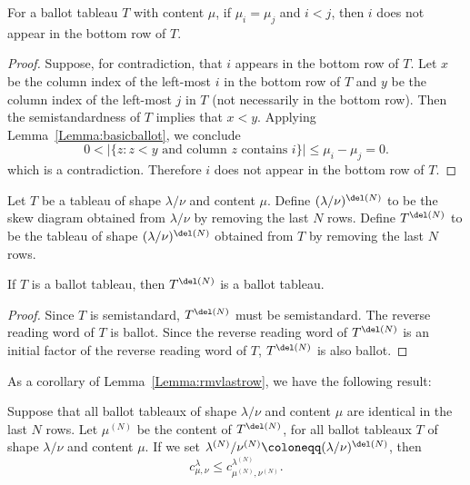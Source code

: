 \begin{lemma}\label{Lemma:rowofT}
For a ballot tableau $T$ with content $\mu$, if $\mu_i= \mu_j$ and $i<j$, then $i$ does not appear in the bottom row of $T$.
\end{lemma}
\begin{proof}
Suppose, for contradiction, that $i$ appears in the bottom row of $T$. Let $x$ be the column index of the left-most $i$ in the bottom row of $T$ and $y$ be the column index of the left-most $j$ in $T$ (not necessarily in the bottom row). Then the semistandardness of $T$ implies that $x<y$. Applying Lemma~\ref{Lemma:basicballot}, we conclude
\[ 
0 < |\{ z : z < y\text{ and column $z$ contains $i$} \}| \leq \mu_i-\mu_j = 0.
\]
which is a contradiction. Therefore $i$ does not appear in the bottom row of $T$.
\end{proof}

\begin{defi} \label{def:skewbottomrowremoval} Let $T$ be a tableau of shape $\lambda / \nu$ and content $\mu$. Define $(\lambda/\nu)^{\del(N)}$ to be the skew diagram obtained from $\lambda/\nu$ by removing the last $N$ rows. Define $T^{\del (N)}$ to be the tableau of shape $(\lambda/\nu)^{\del (N)}$ obtained from $T$ by removing the last $N$ rows. 
\end{defi} 
\begin{lemma}\label{Lemma:rmvlastrow}
If $T$ is a ballot tableau, then $T^{\del (N)}$ is a ballot tableau. 
\end{lemma}
\begin{proof}
Since $T$ is semistandard, $T^{\del (N)}$ must be semistandard. The reverse reading word of $T$ is ballot. Since the reverse reading word of $T^{\del (N)}$ is an initial factor of the reverse reading word of $T$, $T^{\del (N)}$ is also ballot.
\end{proof}

As a corollary of Lemma~\ref{Lemma:rmvlastrow}, we have the following result:

\begin{coro}\label{Cor:rmvlastrow}
Suppose that all ballot tableaux of shape $\lambda/\nu$ and content $\mu$ are identical in the last $N$ rows. Let $\mu^{(N)}$ be the content of $T^{\del (N)}$, for all ballot tableaux $T$ of shape $\lambda/\nu$ and content $\mu$. If we set $\lambda^{(N)}/\nu^{(N)} \coloneqq (\lambda/\nu)^{\del (N)}$, then
\[
c^{\lambda}_{\mu,\nu}\leq c^{\lambda^{(N)}}_{\mu^{(N)},\nu^{(N)}}.
\]

\end{coro}




